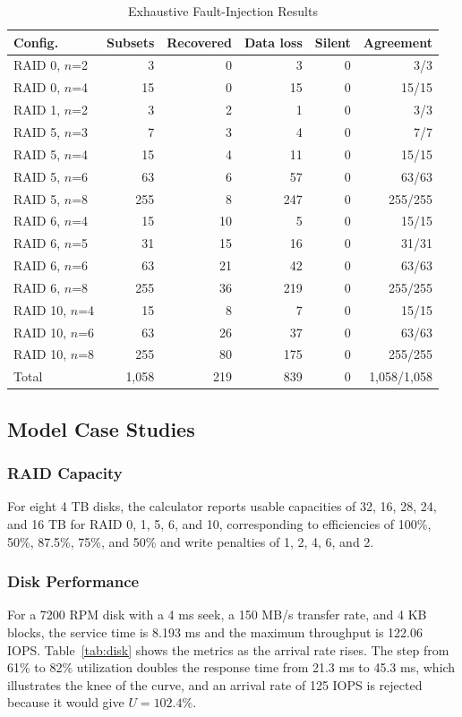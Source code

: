 \documentclass{ieeeaccess}
\begin{document}
\begin{table}[!t]
\caption{Exhaustive Fault-Injection Results}
\label{tab:campaign}
\centering
\footnotesize
\setlength{\tabcolsep}{4pt}
\begin{tabular}{lrrrrr}
\toprule
Config. & Subsets & Recovered & Data loss & Silent & Agreement \\
\midrule
RAID 0, $n$=2 & 3 & 0 & 3 & 0 & 3/3 \\
RAID 0, $n$=4 & 15 & 0 & 15 & 0 & 15/15 \\
RAID 1, $n$=2 & 3 & 2 & 1 & 0 & 3/3 \\
RAID 5, $n$=3 & 7 & 3 & 4 & 0 & 7/7 \\
RAID 5, $n$=4 & 15 & 4 & 11 & 0 & 15/15 \\
RAID 5, $n$=6 & 63 & 6 & 57 & 0 & 63/63 \\
RAID 5, $n$=8 & 255 & 8 & 247 & 0 & 255/255 \\
RAID 6, $n$=4 & 15 & 10 & 5 & 0 & 15/15 \\
RAID 6, $n$=5 & 31 & 15 & 16 & 0 & 31/31 \\
RAID 6, $n$=6 & 63 & 21 & 42 & 0 & 63/63 \\
RAID 6, $n$=8 & 255 & 36 & 219 & 0 & 255/255 \\
RAID 10, $n$=4 & 15 & 8 & 7 & 0 & 15/15 \\
RAID 10, $n$=6 & 63 & 26 & 37 & 0 & 63/63 \\
RAID 10, $n$=8 & 255 & 80 & 175 & 0 & 255/255 \\
\midrule
Total & 1,058 & 219 & 839 & 0 & 1,058/1,058 \\
\bottomrule
\end{tabular}
\end{table}

\subsection{Model Case Studies}
\subsubsection{RAID Capacity}
For eight 4 TB disks, the calculator reports usable capacities of 32, 16, 28, 24, and 16 TB for RAID 0, 1, 5, 6, and 10, corresponding to efficiencies of 100\%, 50\%, 87.5\%, 75\%, and 50\% and write penalties of 1, 2, 4, 6, and 2.

\subsubsection{Disk Performance}
For a 7200 RPM disk with a 4 ms seek, a 150 MB/s transfer rate, and 4 KB blocks, the service time is 8.193 ms and the maximum throughput is 122.06 IOPS. Table~\ref{tab:disk} shows the metrics as the arrival rate rises. The step from 61\% to 82\% utilization doubles the response time from 21.3 ms to 45.3 ms, which illustrates the knee of the curve, and an arrival rate of 125 IOPS is rejected because it would give $U = 102.4\%$.
\end{document}
